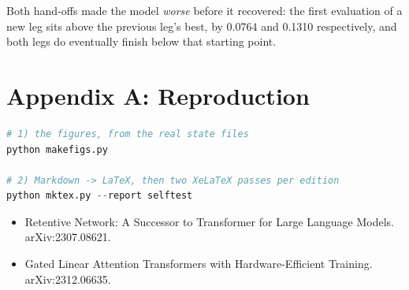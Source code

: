 \documentclass[11pt,openany]{article}
\begin{document}
Both hand-offs made the model \emph{worse} before it recovered: the first evaluation of a new
leg sits above the previous leg's best, by 0.0764 and 0.1310 respectively, and both legs do
eventually finish below that starting point.

\startappendix
\section{Appendix A: Reproduction}

\begin{lstlisting}[language=Python]
# 1) the figures, from the real state files
python makefigs.py

# 2) Markdown -> LaTeX, then two XeLaTeX passes per edition
python mktex.py --report selftest
\end{lstlisting}


\begin{itemize}
  \item Retentive Network: A Successor to Transformer for Large Language Models. arXiv:2307.08621.
  \item Gated Linear Attention Transformers with Hardware-Efficient Training. arXiv:2312.06635.
\end{itemize}
\end{document}
